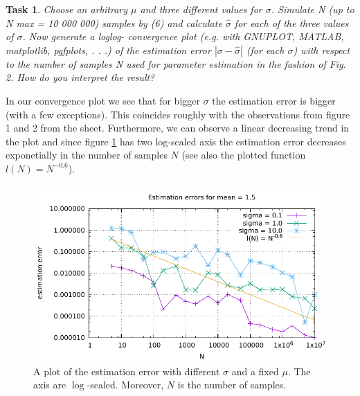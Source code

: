 \documentclass{scrartcl}
\newtheorem{task}{Task}
\begin{document}
	\begin{task}
		Choose an arbitrary $\mu$ and three different values for $\sigma$. Simulate N (up to N max =
		10 000 000) samples by (6) and calculate $\hat{\sigma}$ for each of the three values of $\sigma$. Now generate a loglog-
		convergence plot (e.g. with GNUPLOT, MATLAB, matplotlib, pgfplots, . . .) of the estimation error
		$|\sigma-\hat{\sigma}|$ (for each $\sigma$) with respect to the number of samples N used for parameter estimation in the
		fashion of Fig. 2. How do you interpret the result?
	\end{task}
	In our convergence plot we see that for bigger $\sigma$ the estimation error is bigger (with a few exceptions). This coincides roughly with the observations from figure 1 and 2 from the sheet.
	Furthermore, we can observe a linear decreasing trend in the plot and since figure \ref{fig_conv_plot_est_sigma} has two log-scaled axis the estimation error decreases exponetially in the number of samples $N$ (see also the plotted function $l(N)=N^{-0.6}$).
	\begin{figure}[h!]
		\centering
		\includegraphics[width=\textwidth]{convergence_plot_sigma_estimation}
		\caption{A plot of the estimation error with different $\sigma$ and a fixed $\mu$. The axis are $\log$-scaled. Moreover, $N$ is the number of samples.}
		\label{fig_conv_plot_est_sigma}
	\end{figure}
	
\end{document}

